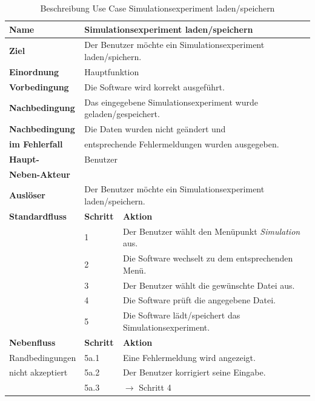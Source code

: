 \begin{table} [H]
	\centering
	\begin{tabular}{|l|l|l|}
		\hline
		\textbf{Name} 			& \multicolumn{2}{|l|}{Simulationsexperiment laden/speichern}  \\
		\hline
		\textbf{Ziel} 			& \multicolumn{2}{|l|}{Der Benutzer möchte ein Simulationsexperiment laden/spichern.}\\
		\hline
		\textbf{Einordnung}		& \multicolumn{2}{|l|}{Hauptfunktion}\\
		\hline
		\textbf{Vorbedingung}	& \multicolumn{2}{|l|}{Die Software wird korrekt ausgeführt.} \\
		\hline
		\textbf{Nachbedingung}	& \multicolumn{2}{|l|}{Das eingegebene Simulationsexperiment wurde geladen/gespeichert.}\\
		\hline
		\textbf{Nachbedingung} 	& \multicolumn{2}{|l|}{Die Daten wurden nicht geändert und}\\
		\textbf{im Fehlerfall}	& \multicolumn{2}{|l|}{entsprechende Fehlermeldungen wurden ausgegeben.}\\
		\hline
		\textbf{Haupt-} 		& \multicolumn{2}{|l|}{Benutzer}\\
		\textbf{Neben-Akteur}	& \multicolumn{2}{|l|}{	}			\\
		\hline
		\textbf{Auslöser} 		& \multicolumn{2}{|l|}{Der Benutzer möchte ein Simulationsexperiment laden/speichern.} \\
		\hline 
		\textbf{Standardfluss} & \textbf{Schritt} & \textbf{Aktion} \\
		\hline
		&	1	& Der Benutzer wählt den Menüpunkt \emph{Simulation} aus. \\
		\cline{2-3}
		&	2	& Die Software wechselt zu dem entsprechenden Menü.\\
		\cline{2-3}
		&	3	& Der Benutzer wählt die gewünschte Datei aus.\\
		\cline{2-3}
		&	4	& Die Software prüft die angegebene Datei.\\
		\cline{2-3}
		&	5	& Die Software lädt/speichert das Simulationsexperiment.\\
		\hline
		\textbf{Nebenfluss} & \textbf{Schritt} & \textbf{Aktion}\\
		\hline
		Randbedingungen  & 5a.1 & Eine Fehlermeldung wird angezeigt.\\
		\cline{2-3}
		nicht akzeptiert & 5a.2	& Der Benutzer korrigiert seine Eingabe.\\
		\cline{2-3}
		& 5a.3 	& $\rightarrow$ Schritt 4\\
		\hline
	\end{tabular}
	\caption{Beschreibung Use Case Simulationsexperiment laden/speichern}
	\label{Beschreibung Use Case Simulationsexperiment laden/speichern}
\end{table}

